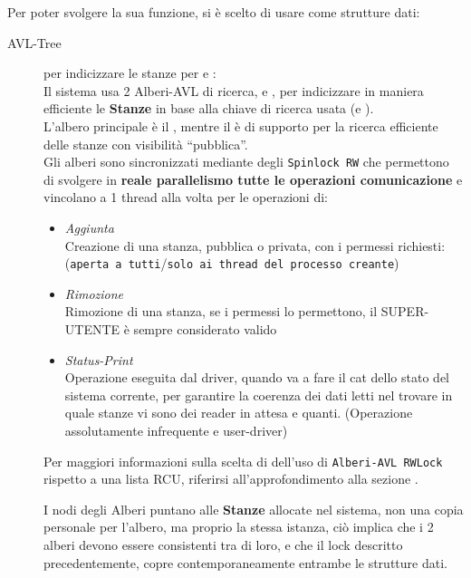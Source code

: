 Per poter svolgere la sua funzione, si è scelto di usare come strutture dati:
\begin{description}
\item[AVL-Tree] per indicizzare le stanze per \tagSys e \keySys:\\
    Il sistema usa 2 Alberi-AVL di ricerca, \tagTree e \keyTree, per indicizzare in maniera efficiente le
    \textbf{Stanze} in base alla chiave di ricerca usata (\tagSys e \keySys). \\
    L'albero principale è il \tagTree, mentre il \keyTree è di supporto per la ricerca efficiente delle
    stanze con visibilità ``pubblica''.\\
    Gli alberi sono sincronizzati mediante degli \texttt{Spinlock RW} che permettono di svolgere in \textbf{reale
    parallelismo tutte le operazioni comunicazione} e vincolano a 1 thread alla volta per le operazioni di:
    \begin{itemize}
    \item \textit{Aggiunta} \\
        Creazione di una stanza, pubblica o privata, con i permessi richiesti:\\
        (\texttt{aperta a tutti}/\texttt{solo ai thread del processo creante})
    \item \textit{Rimozione} \\
        Rimozione di una stanza, se i permessi lo permettono, il SUPER-UTENTE è sempre considerato valido
    \item \textit{Status-Print} \\
        Operazione eseguita dal driver, quando va a fare il cat dello stato del sistema corrente, per garantire la
        coerenza dei dati letti nel trovare in quale stanze vi sono dei reader in attesa e quanti. (Operazione
        assolutamente infrequente e user-driver)
\end{itemize}

\begin{footnotesize}
Per maggiori informazioni sulla scelta di dell'uso di \texttt{Alberi-AVL RWLock} rispetto a una lista
RCU, riferirsi all'approfondimento alla sezione .
\end{footnotesize}

I nodi degli Alberi puntano alle \textbf{Stanze} allocate nel sistema, non una copia personale per l'albero, ma
proprio la stessa istanza, ciò implica che i 2 alberi devono essere consistenti tra di loro, e che il lock
descritto precedentemente, copre contemporaneamente entrambe le strutture dati.


\end{description}
